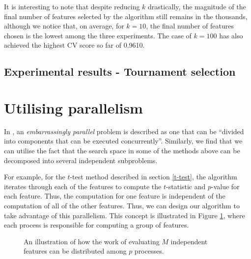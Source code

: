 \documentclass[12pt, twoside, a4paper]{report}
\begin{document}
It is interesting to note that despite reducing $k$ drastically, the magnitude of the final number of features selected by the algorithm still remains in the thousands, although we notice that, on average, for $k=10$, the final number of features chosen is the lowest among the three experiments. The case of $k=100$ has also achieved the highest CV score so far of 0.9610.

\subsection{Experimental results - Tournament selection}


\section{Utilising parallelism} \label{body:parallel}

In \cite{RefWorks:221}, an \textit{embarrassingly parallel} problem is described as one that can be ``divided into components that can be executed concurrently''. Similarly, we find that we can utilise the fact that the search space in some of the methods above can be decomposed into several independent subproblems.

For example, for the $t$-test method described in section \ref{t-test}, the algorithm iterates through each of the features to compute the $t$-statistic and $p$-value for each feature. Thus, the computation for one feature is independent of the computation of all of the other features. Thus, we can design our algorithm to take advantage of this parallelism. This concept is illustrated in Figure \ref{body:parallelism_diag}, where each process is responsible for computing a group of features.

\begin{figure}
\centering
{}
\caption{An illustration of how the work of evaluating $M$ independent features can be distributed among $p$ processes.}
\label{body:parallelism_diag}
\end{figure}
\end{document}

